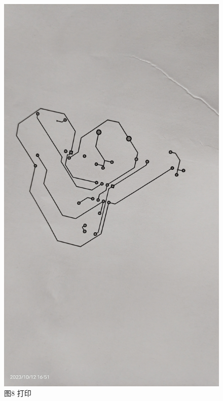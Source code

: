 \documentclass[a4paper,12pt]{article}
\begin{document}
\begin{enumerate}
\begin{figure}[h]
\begin{minipage}{0.35\textwidth}
					\includegraphics[width=\textwidth,height=0.3\textheight]{5.jpg}
					\caption*{图8 打印}
				\end{minipage}
				\qquad
				\begin{minipage}{0.35\textwidth}
					\centering

\end{minipage}
\end{figure}
\end{enumerate}
\end{document}
